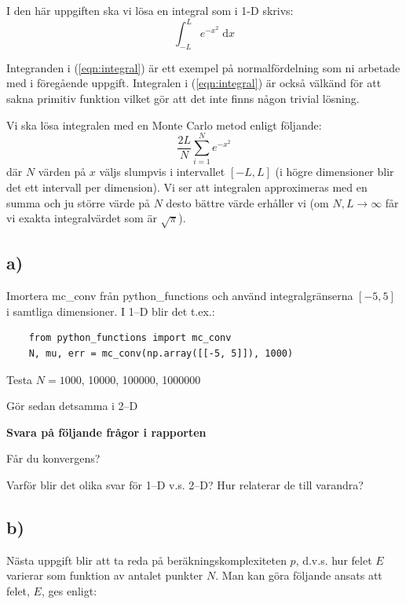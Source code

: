 \documentclass[a4paper]{article}
\begin{document}
I den här uppgiften ska vi lösa en integral som i 1-D skrivs:
\begin{equation} \label{eqn:integral}
    \int_{-L}^{L}e^{-x^2}\; \mathrm{d}x
\end{equation}

Integranden i (\ref{eqn:integral}) är ett exempel på normalfördelning som ni arbetade med i föregående uppgift.
Integralen i (\ref{eqn:integral}) är också välkänd för att sakna primitiv funktion vilket gör att det inte
finns någon trivial lösning.

Vi ska lösa integralen med en Monte Carlo metod enligt följande:
\begin{equation} \label{eqn:integral_mc}
    \frac{2L}{N}\displaystyle\sum_{i=1}^{N}e^{-x^2}
\end{equation}
där \(N\) värden på \(x\) väljs slumpvis i intervallet \([-L,L]\)
(i högre dimensioner blir det ett intervall per dimension).
Vi ser att integralen approximeras med en summa och ju större värde på
\(N\) desto bättre värde erhåller vi (om \(N,L \rightarrow \infty\) får vi exakta integralvärdet som är \( \sqrt{\pi} \)).


\subsection{a)}
Imortera mc\_conv från python\_functions och använd integralgränserna \( [-5, 5] \) i samtliga dimensioner.
I 1--D blir det t.ex.:
\begin{lstlisting}
    from python_functions import mc_conv
    N, mu, err = mc_conv(np.array([[-5, 5]]), 1000)
\end{lstlisting}
Testa \( N=1000 \), 10000, 100000, 1000000

Gör sedan detsamma i 2--D


\textbf{Svara på följande frågor i rapporten}

Får du konvergens?

Varför blir det olika svar för 1--D v.s. 2--D? Hur relaterar de till varandra?


\subsection{b)}
Nästa uppgift blir att ta reda på beräkningskomplexiteten \(p\), d.v.s.
hur felet \(E\) varierar som funktion av antalet punkter \(N\).
Man kan göra följande ansats att felet, \(E\), ges enligt:
\end{document}
